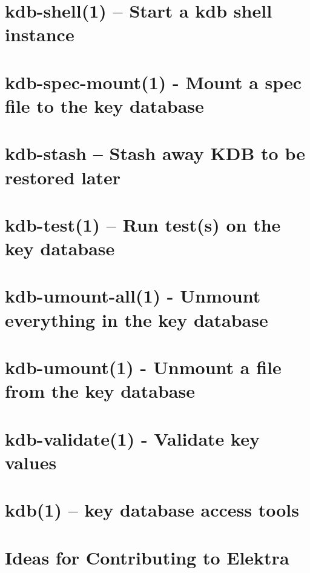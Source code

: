 \let\mypdfximage\pdfximage\def\pdfximage{\immediate\mypdfximage}\documentclass[twoside]{book}
\newcommand{\+}{\discretionary{\mbox{\scriptsize$\hookleftarrow$}}{}{}}
\begin{document}
\chapter{kdb-\/shell(1) -- Start a kdb shell instance}
\label{doc_help_kdb-shell_md}

\chapter{kdb-\/spec-\/mount(1) -\/ Mount a spec file to the key database}
\label{doc_help_kdb-spec-mount_md}

\chapter{kdb-\/stash -- Stash away KDB to be restored later}
\label{doc_help_kdb-stash_md}

\chapter{kdb-\/test(1) -- Run test(s) on the key database}
\label{doc_help_kdb-test_md}

\chapter{kdb-\/umount-\/all(1) -\/ Unmount everything in the key database}
\label{doc_help_kdb-umount-all_md}

\chapter{kdb-\/umount(1) -\/ Unmount a file from the key database}
\label{doc_help_kdb-umount_md}

\chapter{kdb-\/validate(1) -\/ Validate key values}
\label{doc_help_kdb-validate_md}

\chapter{kdb(1) -- key database access tools}
\label{doc_help_kdb_md}

\chapter{Ideas for Contributing to Elektra}
\label{doc_IDEAS_md}

\end{document}
